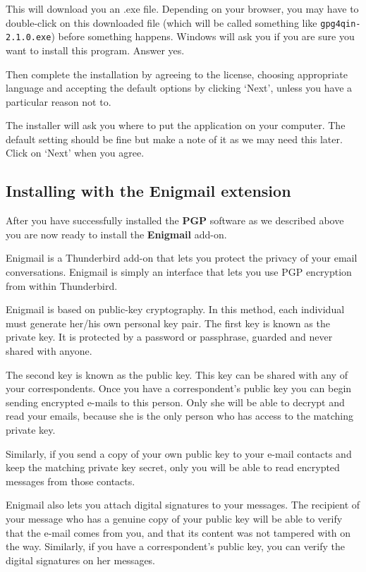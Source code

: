 This will download you an .exe file. Depending on your browser, you may
have to double-click on this downloaded file (which will be called
something like \verb!gpg4qin-2.1.0.exe!) before something happens.
Windows will ask you if you are sure you want to install this program.
Answer yes.

Then complete the installation by agreeing to the license, choosing
appropriate language and accepting the default options by clicking
`Next', unless you have a particular reason not to.

The installer will ask you where to put the application on your
computer. The default setting should be fine but make a note of it as we
may need this later. Click on `Next' when you agree.

\subsection{Installing with the Enigmail extension}

After you have successfully installed the \textbf{PGP} software as we
described above you are now ready to install the \textbf{Enigmail}
add-on.

Enigmail is a Thunderbird add-on that lets you protect the privacy of
your email conversations. Enigmail is simply an interface that lets you
use PGP encryption from within Thunderbird.

Enigmail is based on public-key cryptography. In this method, each
individual must generate her/his own personal key pair. The first key is
known as the private key. It is protected by a password or passphrase,
guarded and never shared with anyone.

The second key is known as the public key. This key can be shared with
any of your correspondents. Once you have a correspondent's public key
you can begin sending encrypted e-mails to this person. Only she will be
able to decrypt and read your emails, because she is the only person who
has access to the matching private key.

Similarly, if you send a copy of your own public key to your e-mail
contacts and keep the matching private key secret, only you will be able
to read encrypted messages from those contacts.

Enigmail also lets you attach digital signatures to your messages. The
recipient of your message who has a genuine copy of your public key will
be able to verify that the e-mail comes from you, and that its content
was not tampered with on the way. Similarly, if you have a
correspondent's public key, you can verify the digital signatures on her
messages.

